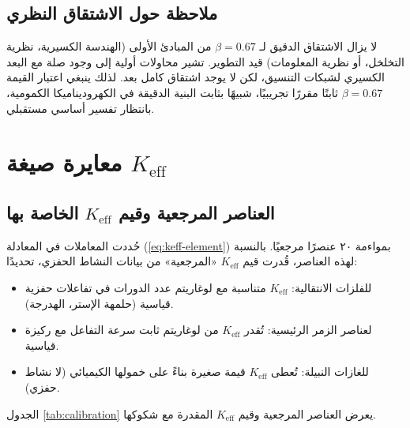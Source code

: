 \documentclass[12pt,a4paper]{article}
\theoremstyle{remark}
\newcommand{\Keff}{K_{\mathrm{eff}}}
\begin{document}
	\subsection{ملاحظة حول الاشتقاق النظري}
	
	لا يزال الاشتقاق الدقيق لـ $\beta = 0.67$ من المبادئ الأولى (الهندسة الكسيرية، نظرية التخلخل، أو نظرية المعلومات) قيد التطوير. تشير محاولات أولية إلى وجود صلة مع البعد الكسيري لشبكات التنسيق، لكن لا يوجد اشتقاق كامل بعد. لذلك ينبغي اعتبار القيمة $\beta = 0.67$ ثابتًا مقررًا تجريبيًا، شبيهًا بثابت البنية الدقيقة في الكهروديناميكا الكمومية، بانتظار تفسير أساسي مستقبلي.
	
	\section{معايرة صيغة $\Keff$}
	\label{sec:calibration}
	
	\subsection{العناصر المرجعية وقيم $\Keff$ الخاصة بها}
	
	حُددت المعاملات في المعادلة (\ref{eq:keff-element}) بمواءمة ٢٠ عنصرًا مرجعيًا. بالنسبة لهذه العناصر، قُدرت قيم $\Keff$ «المرجعية» من بيانات النشاط الحفزي، تحديدًا:
	
	\begin{itemize}
		\item للفلزات الانتقالية: $\Keff$ متناسبة مع لوغاريتم عدد الدورات في تفاعلات حفزية قياسية (حلمهة الإستر، الهدرجة).
		\item لعناصر الزمر الرئيسية: تُقدر $\Keff$ من لوغاريتم ثابت سرعة التفاعل مع ركيزة قياسية.
		\item للغازات النبيلة: تُعطى $\Keff$ قيمة صغيرة بناءً على خمولها الكيميائي (لا نشاط حفزي).
	\end{itemize}
	
	الجدول \ref{tab:calibration} يعرض العناصر المرجعية وقيم $\Keff$ المقدرة مع شكوكها.
	
\end{document}
